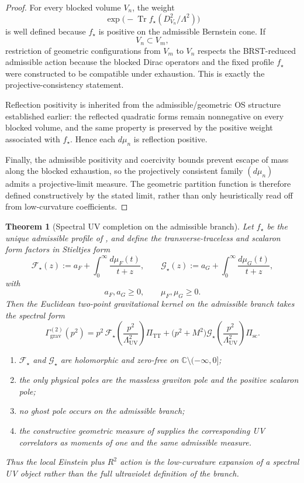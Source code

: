 \documentclass[11pt,a4paper]{article}
\newtheorem{theorem}{Theorem}[section]
\theoremstyle{definition}
\theoremstyle{remark}
\DeclareMathOperator{\tr}{Tr}
\begin{document}
\begin{proof}
For every blocked volume $V_n$, the weight
\[
\exp\!\bigl(-\tr f_\star(D_{V_n}^2/\Lambda^2)\bigr)
\]
is well defined because $f_\star$ is positive on the admissible Bernstein cone. If
\[
V_n\subset V_m,
\]
restriction of geometric configurations from $V_m$ to $V_n$ respects the BRST-reduced admissible
action because the blocked Dirac operators and the fixed profile $f_\star$ were constructed to be
compatible under exhaustion. This is exactly the projective-consistency statement.

Reflection positivity is inherited from the admissible/geometric OS structure established earlier:
the reflected quadratic forms remain nonnegative on every blocked volume, and the same property is
preserved by the positive weight associated with $f_\star$. Hence each $d\mu_n$ is reflection
positive.

Finally, the admissible positivity and coercivity bounds prevent escape of mass along the blocked
exhaustion, so the projectively consistent family $(d\mu_n)$ admits a projective-limit measure. The
geometric partition function is therefore defined constructively by the stated limit, rather than
only heuristically read off from low-curvature coefficients.
\end{proof}

\begin{theorem}[Spectral UV completion on the admissible branch]
\label{thm:spectral-uv-completion}
Let $f_\star$ be the unique admissible profile of , and define
the transverse-traceless and scalaron form factors in Stieltjes form
\[
\mathcal F_\star(z)
:=
a_F+\int_0^\infty \frac{d\mu_F(t)}{t+z},
\qquad
\mathcal G_\star(z)
:=
a_G+\int_0^\infty \frac{d\mu_G(t)}{t+z},
\]
with
\[
a_F,a_G\ge 0,
\qquad
\mu_F,\mu_G\ge 0.
\]
Then the Euclidean two-point gravitational kernel on the admissible branch takes the spectral form
\[
\Gamma_{\mathrm{grav}}^{(2)}(p^2)
=
p^2\,\mathcal F_\star\!\left(\frac{p^2}{\Lambda_{\mathrm{UV}}^2}\right)\Pi_{\mathrm{TT}}
+
\bigl(p^2+M^2\bigr)\mathcal G_\star\!\left(\frac{p^2}{\Lambda_{\mathrm{UV}}^2}\right)\Pi_{\mathrm{sc}}.
\]
\begin{enumerate}[label=(\roman*), leftmargin=1.5em, topsep=3pt, itemsep=2pt]
    \item $\mathcal F_\star$ and $\mathcal G_\star$ are holomorphic and zero-free on
    $\mathbb C\setminus(-\infty,0]$;
    \item the only physical poles are the massless graviton pole and the positive scalaron pole;
    \item no ghost pole occurs on the admissible branch;
    \item the constructive geometric measure of  supplies the
    corresponding UV correlators as moments of one and the same admissible measure.
\end{enumerate}
Thus the local Einstein plus $R^2$ action is the low-curvature expansion of a spectral UV object
rather than the full ultraviolet definition of the branch.
\end{theorem}
\end{document}
